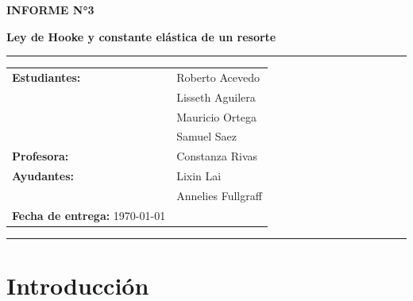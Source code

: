 \documentclass[12pt,a4paper]{article}
\begin{document}
\begin{center}
{\Large\textbf{INFORME N°3}}

{\LARGE\textbf{Ley de Hooke y constante elástica de un resorte}}

\rule{\textwidth}{0.5pt}

\begin{tabular}{ll}
    \textbf{Estudiantes:} & Roberto Acevedo \\
                          & Lisseth Aguilera \\
                          & Mauricio Ortega \\
                          & Samuel Saez \\[0.2cm]
    \textbf{Profesora:}   & Constanza Rivas \\
    \textbf{Ayudantes:}    & Lixin Lai \\
                           & Annelies Fullgraff \\[0.2cm]
    \textbf{Fecha de entrega:} \today
\end{tabular}

\vspace{0.4cm}
\rule{\textwidth}{0.5pt}

\end{center}

\section{Introducción}
\end{document}
